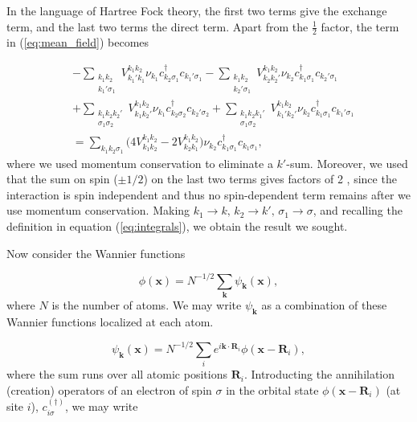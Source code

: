 In the language of Hartree Fock theory, the first two terms give the exchange term, and the last two terms the direct term. Apart from the $\frac{1}{2}$ factor, the term in (\ref{eq:mean_field}) becomes

\begin{equation}
\begin{split}
&- \sum_{\substack{k_1 k_2 \\ k_1' \sigma_1}} V_{k_1' k_1}^{k_1 k_2} \nu_{k_1} c_{k_2 \sigma_1}^\dagger c_{k_1' \sigma_1}  - \sum_{\substack{k_1 k_2 \\ k_2' \sigma_1}} V_{k_2 k_2'}^{k_1 k_2} \nu_{k_2} c_{k_1 \sigma_1}^\dagger c_{k_2' \sigma_1} \\
&+ \sum_{\substack{k_1 k_2 k_2' \\ \sigma_1 \sigma_2}} V_{k_1 k_2'}^{k_1 k_2} \nu_{k_1} c_{k_2 \sigma_2}^\dagger c_{k_2' \sigma_2}  + \sum_{\substack{k_1 k_2 k_1' \\  \sigma_1 \sigma_2}} V_{k_1' k_2'}^{k_1 k_2} \nu_{k_2} c_{k_1 \sigma_1}^\dagger c_{k_1' \sigma_1} \\
&= \sum_{k_1 k_2 \sigma_1} \bigg( 4 V_{k_1 k_2}^{k_1 k_2} - 2  V_{k_2 k_1}^{k_1 k_2}  \bigg) \nu_{k_2} c_{k_1 \sigma_1}^\dagger c_{k_1 \sigma_1}
,
\end{split}
\end{equation}
where we used momentum conservation to eliminate a $k'$-sum. Moreover, we used that the sum on spin ($\pm 1/2$) on the last two terms gives factors of 2 , since the interaction is spin independent and thus no spin-dependent term remains after we use momentum conservation. Making $k_1 \rightarrow k , \, k_2 \rightarrow k', \, \sigma_1 \rightarrow \sigma$, and recalling the definition in equation (\ref{eq:integrals}), we obtain the result we sought.

Now consider the Wannier functions

\begin{equation}
\phi(\bm x) = N^{-1/2} \sum_{\bm k} \psi_{\bm k} (\bm x) , 
\end{equation}
where $N$ is the number of atoms. We may write $\psi_{\bm k}$ as a  combination of these Wannier functions localized at each atom.

\begin{equation}
\psi_{\bm k} (\bm x) = N^{-1/2} \sum_i e^{i \bm k \cdot \bm R_i} \phi (\bm x - \bm R_i) ,
\end{equation}
where the sum runs over all atomic positions $\bm R_i$. Introducting the annihilation (creation) operators of an electron of spin $\sigma$ in the orbital state $\phi (\bm x - \bm R_i)$ (at site $i$), $c_{i\sigma}^{(\dagger)}$, we may write

